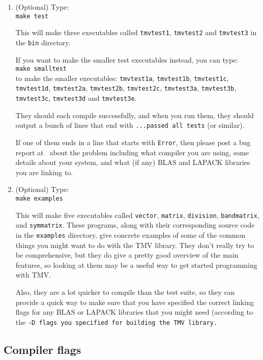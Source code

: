 \begin{enumerate}
\item
(Optional) Type:\\
\texttt{make test}

This will make three executables called \texttt{tmvtest1}, 
\texttt{tmvtest2} and \texttt{tmvtest3} in the \texttt{bin} directory.

If you want to make the smaller test executables instead, you can type:\\
\texttt{make smalltest}\\
to make the smaller executables: \texttt{tmvtest1a}, \texttt{tmvtest1b}, \texttt{tmvtest1c}, \texttt{tmvtest1d}, \texttt{tmvtest2a}, \texttt{tmvtest2b}, \texttt{tmvtest2c}, \texttt{tmvtest3a}, \texttt{tmvtest3b}, \texttt{tmvtest3c}, 
\texttt{tmvtest3d} and \texttt{tmvtest3e}.

They should each compile successfully, and when you run them, they
should output a bunch of lines that end with \texttt{...passed all tests}
(or similar).  

If one of them ends in a line that starts with \texttt{Error}, 
then please post a bug report at \myissues\ about the problem including what compiler
you are using, some details about your system, and what (if any) BLAS and LAPACK
libraries you are linking to.

\item
(Optional) Type:\\
\texttt{make examples} 

This will make five executables called \texttt{vector}, \texttt{matrix}, \texttt{division},
\texttt{bandmatrix}, and \texttt{symmatrix}.
These programs, along with their corresponding source code in the \texttt{examples}
directory, give concrete examples of some of the common things you might want
to do with the TMV library.  They don't really try to be comprehensive,
but they do give a pretty good overview of the main features,
so looking at them may be a useful way to get started programming with TMV.

Also, they are a lot quicker to compile than the test suite, so they can provide a 
quick way to make sure that you have specified the correct linking flags for any
BLAS or LAPACK libraries that you might need (according to the \tt{-D} flags
you specified for building the TMV library.

\end{enumerate}

\subsection{Compiler flags}
\label{Install_Flags}

